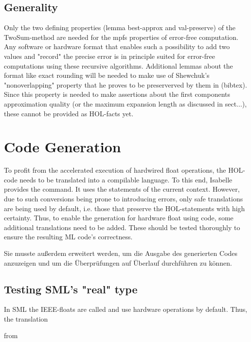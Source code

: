 \documentclass[11pt,a4paper]{article}
\begin{document}
\subsection{Generality}

Only the two defining properties (lemma best-approx and val-preserve) of the TwoSum-method are needed for the mpfs properties of error-free computation. Any software or hardware format that enables such a possibility to add two values and "record" the precise error is in principle suited for error-free computations using these recursive algorithms. Additional lemmas about the format like exact rounding will be needed to make use of Shewchuk's "nonoverlapping" property that he proves to be preserverved by them in (bibtex). Since this property is needed to make assertions about the first components approximation quality (or the maximum expansion length as discussed in sect...), these cannot be provided as HOL-facts yet.

\section{Code Generation}
To profit from the accelerated execution of hardwired float operations, the HOL-code needs to be translated into a compilable language. To this end, Isabelle provides the
command. It uses the 
statements of the current context. However, due to such conversions being prone to introducing errors, only safe translations are being used by default, i.e. those that preserve the HOL-statements with high certainty. Thus, to enable the generation for hardware float using code, some additional translations need to be added. These should be tested thoroughly to ensure the resulting ML code's correctness.

Sie musste außerdem erweitert werden, um die Ausgabe des generierten Codes anzuzeigen und um die Überprüfungen auf Überlauf durchführen zu können.

\subsection{Testing SML's "real" type}

In SML the IEEE-floats are called
and use hardware operations by default. Thus, the translation

from
 
\end{document}
